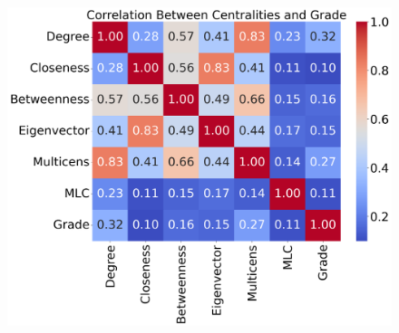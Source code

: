 \documentclass[10pt,letterpaper]{article}
\begin{document}
\begin{figure}[h!]
\hspace{0.5cm}
\begin{minipage}[b]{0.28\linewidth}
\centering
\includegraphics[width=\textwidth]{figs/fig30-hif1a_arnt-corr.png}
\subcaption{}
\end{minipage}


\vspace{0.5cm}


\end{figure}
\end{document}
